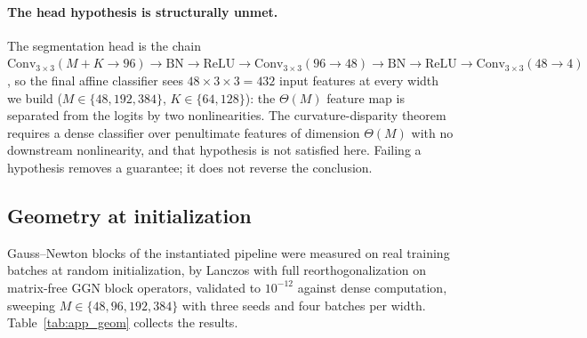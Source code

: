 \paragraph{The head hypothesis is structurally unmet.} The segmentation head is
the chain $\mathrm{Conv}_{3\times3}(M{+}K \to 96) \to \mathrm{BN} \to
\mathrm{ReLU} \to \mathrm{Conv}_{3\times3}(96 \to 48) \to \mathrm{BN} \to
\mathrm{ReLU} \to \mathrm{Conv}_{3\times3}(48 \to 4)$, so the final affine
classifier sees $48 \times 3 \times 3 = 432$ input features at every width we
build ($M \in \{48, 192, 384\}$, $K \in \{64, 128\}$): the $\Theta(M)$ feature
map is separated from the logits by two nonlinearities. The
curvature-disparity theorem requires a dense classifier over penultimate
features of dimension $\Theta(M)$ with no downstream nonlinearity, and that
hypothesis is not satisfied here. Failing a hypothesis removes a guarantee; it
does not reverse the conclusion.

\subsection{Geometry at initialization}
\label{app:prod_geometry}

Gauss--Newton blocks of the instantiated pipeline were measured on real
training batches at random initialization, by Lanczos with full
reorthogonalization on matrix-free GGN block operators, validated to $10^{-12}$
against dense computation, sweeping $M \in \{48, 96, 192, 384\}$ with three
seeds and four batches per width. Table~\ref{tab:app_geom} collects the
results.

